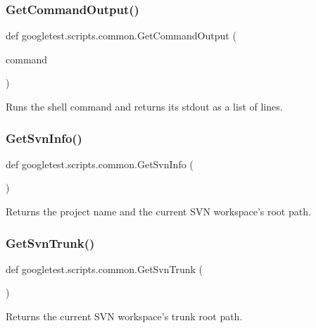 \subsubsection{\texorpdfstring{GetCommandOutput()}{GetCommandOutput()}}
{\footnotesize\ttfamily def googletest.\+scripts.\+common.\+Get\+Command\+Output (\begin{DoxyParamCaption}\item[{}]{command }\end{DoxyParamCaption})}

\begin{DoxyVerb}Runs the shell command and returns its stdout as a list of lines.\end{DoxyVerb}
 \mbox{\label{namespacegoogletest_1_1scripts_1_1common_a5749e9f6b59977a3c38235877d6f46ec}} 
\subsubsection{\texorpdfstring{GetSvnInfo()}{GetSvnInfo()}}
{\footnotesize\ttfamily def googletest.\+scripts.\+common.\+Get\+Svn\+Info (\begin{DoxyParamCaption}{ }\end{DoxyParamCaption})}

\begin{DoxyVerb}Returns the project name and the current SVN workspace's root path.\end{DoxyVerb}
 \mbox{\label{namespacegoogletest_1_1scripts_1_1common_a8456e601f756b4a572d51add434d9f66}} 
\subsubsection{\texorpdfstring{GetSvnTrunk()}{GetSvnTrunk()}}
{\footnotesize\ttfamily def googletest.\+scripts.\+common.\+Get\+Svn\+Trunk (\begin{DoxyParamCaption}{ }\end{DoxyParamCaption})}

\begin{DoxyVerb}Returns the current SVN workspace's trunk root path.\end{DoxyVerb}
 \mbox{\label{namespacegoogletest_1_1scripts_1_1common_a632fa0f65eb653d5feef5c7c597a5953}} 
